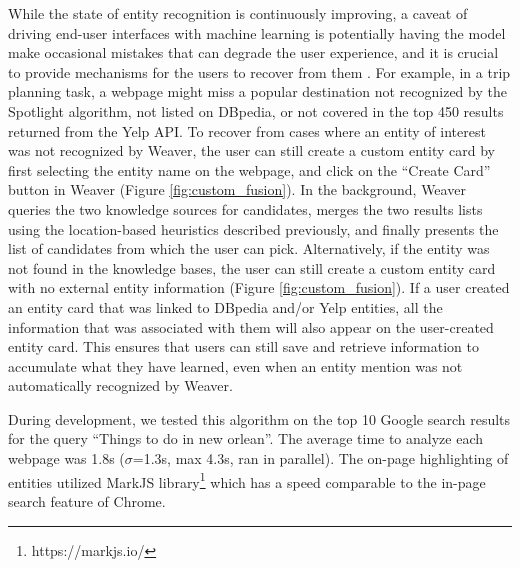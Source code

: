 While the state of entity recognition is continuously improving, a caveat of driving end-user interfaces with machine learning is potentially having the model make occasional mistakes that can degrade the user experience, and it is crucial to provide mechanisms for the users to recover from them \cite{lewis1995designing,lee2010gracefully,kocielnik2019will}. For example, in a trip planning task, a webpage might miss a popular destination not recognized by the Spotlight algorithm, not listed on DBpedia, or not covered in the top 450 results returned from the Yelp API.
To recover from cases where an entity of interest was not recognized by Weaver, the user can still create a custom entity card by first selecting the entity name on the webpage, and click on the ``Create Card'' button in Weaver (Figure \ref{fig:custom_fusion}). In the background, Weaver queries the two knowledge sources for candidates, merges the two results lists using the location-based heuristics described previously, and finally presents the list of candidates from which the user can pick.  Alternatively, if the entity was not found in the knowledge bases, the user can still create a custom entity card with no external entity information (Figure \ref{fig:custom_fusion}).
If a user created an entity card that was linked to DBpedia and/or Yelp entities, all the information that was associated with them will also appear on the user-created entity card. This ensures that users can still save and retrieve information to accumulate what they have learned, even when an entity mention was not automatically recognized by Weaver.

During development, we tested this algorithm on the top 10 Google search results for the query ``Things to do in new orlean''. The average time to analyze each webpage was 1.8s ($\sigma$=1.3s, max 4.3s, ran in parallel). The on-page highlighting of entities utilized MarkJS library\footnote{https://markjs.io/} which has a speed comparable to the in-page search feature of Chrome.%





 
